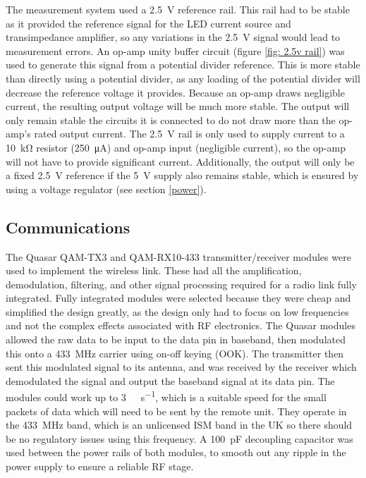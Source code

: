 The measurement system used a \SI{2.5}{\volt} reference rail. This rail had to be stable as it provided the reference signal for the LED current source and transimpedance amplifier, so any variations in the \SI{2.5}{\volt} signal would lead to measurement errors. An op-amp unity buffer circuit (figure \ref{fig: 2.5v rail}) was used to generate this signal from a potential divider reference. This is more stable than directly using a potential divider, as any loading of the potential divider will decrease the reference voltage it provides. Because an op-amp draws negligible current, the resulting output voltage will be much more stable. The output will only remain stable the circuits it is connected to do not draw more than the op-amp's rated output current. The \SI{2.5}{\volt} rail is only used to supply current to a \SI{10}{\kilo\ohm} resistor (\SI{250}{\micro\ampere}) and op-amp input (negligible current), so the op-amp will not have to provide significant current. Additionally, the output will only be a fixed \SI{2.5}{\volt} reference if the \SI{5}{\volt} supply also remains stable, which is ensured by using a voltage regulator (see section \ref{power}).\\



\subsection{Communications}
The Quasar QAM-TX3 \cite{qam-tx} and QAM-RX10-433 \cite{qam-rx} transmitter/receiver modules were used to implement the wireless link. These had all the amplification, demodulation, filtering, and other signal processing required for a radio link fully integrated. Fully integrated modules were selected because they were cheap and simplified the design greatly, as the design only had to focus on low frequencies and not the complex effects associated with RF electronics. The Quasar modules allowed the raw data to be input to the data pin in baseband, then modulated this onto a \SI{433}{\mega\hertz} carrier using on-off keying (OOK). The transmitter then sent this modulated signal to its antenna, and was received by the receiver which demodulated the signal and output the baseband signal at its data pin. The modules could work up to \SI{3}{\kilo\bit\per\second}, which is a suitable speed for the small packets of data which will need to be sent by the remote unit. They operate in the \SI{433}{\mega\hertz} band, which is an unlicensed ISM band in the UK \cite{ism_band} so there should be no regulatory issues using this frequency. A \SI{100}{\pico\farad} decoupling capacitor was used between the power rails of both modules, to smooth out any ripple in the power supply to ensure a reliable RF stage.\\

